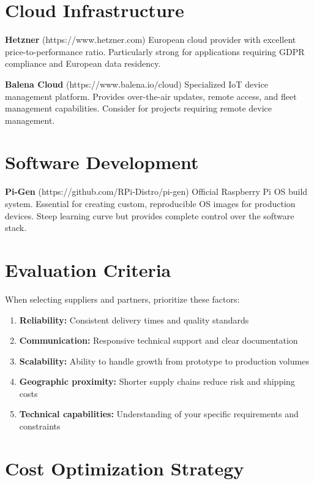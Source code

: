 \section{Cloud Infrastructure}

\textbf{Hetzner} (https://www.hetzner.com)
European cloud provider with excellent price-to-performance ratio. Particularly strong for applications requiring GDPR compliance and European data residency.

\textbf{Balena Cloud} (https://www.balena.io/cloud)
Specialized IoT device management platform. Provides over-the-air updates, remote access, and fleet management capabilities. Consider for projects requiring remote device management.

\section{Software Development}

\textbf{Pi-Gen} (https://github.com/RPi-Distro/pi-gen)
Official Raspberry Pi OS build system. Essential for creating custom, reproducible OS images for production devices. Steep learning curve but provides complete control over the software stack.

\section{Evaluation Criteria}

When selecting suppliers and partners, prioritize these factors:

\begin{enumerate}
\item \textbf{Reliability:} Consistent delivery times and quality standards
\item \textbf{Communication:} Responsive technical support and clear documentation
\item \textbf{Scalability:} Ability to handle growth from prototype to production volumes
\item \textbf{Geographic proximity:} Shorter supply chains reduce risk and shipping costs
\item \textbf{Technical capabilities:} Understanding of your specific requirements and constraints
\end{enumerate}

\section{Cost Optimization Strategy}


